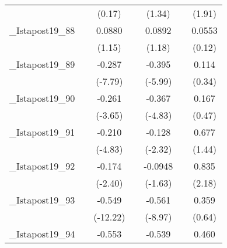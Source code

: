 {\begin{tabular}{l*{6}{c}}
            &                     &      (0.17)         &                     &      (1.34)         &                     &      (1.91)         \\
[1em]
\_Istapost19\_88&                     &      0.0880         &                     &      0.0892         &                     &      0.0553         \\
            &                     &      (1.15)         &                     &      (1.18)         &                     &      (0.12)         \\
[1em]
\_Istapost19\_89&                     &      -0.287\sym{***}&                     &      -0.395\sym{***}&                     &       0.114         \\
            &                     &     (-7.79)         &                     &     (-5.99)         &                     &      (0.34)         \\
[1em]
\_Istapost19\_90&                     &      -0.261\sym{***}&                     &      -0.367\sym{***}&                     &       0.167         \\
            &                     &     (-3.65)         &                     &     (-4.83)         &                     &      (0.47)         \\
[1em]
\_Istapost19\_91&                     &      -0.210\sym{***}&                     &      -0.128\sym{*}  &                     &       0.677         \\
            &                     &     (-4.83)         &                     &     (-2.32)         &                     &      (1.44)         \\
[1em]
\_Istapost19\_92&                     &      -0.174\sym{*}  &                     &     -0.0948         &                     &       0.835\sym{*}  \\
            &                     &     (-2.40)         &                     &     (-1.63)         &                     &      (2.18)         \\
[1em]
\_Istapost19\_93&                     &      -0.549\sym{***}&                     &      -0.561\sym{***}&                     &       0.359         \\
            &                     &    (-12.22)         &                     &     (-8.97)         &                     &      (0.64)         \\
[1em]
\_Istapost19\_94&                     &      -0.553\sym{***}&                     &      -0.539\sym{***}&                     &       0.460         \\

\end{tabular}}
